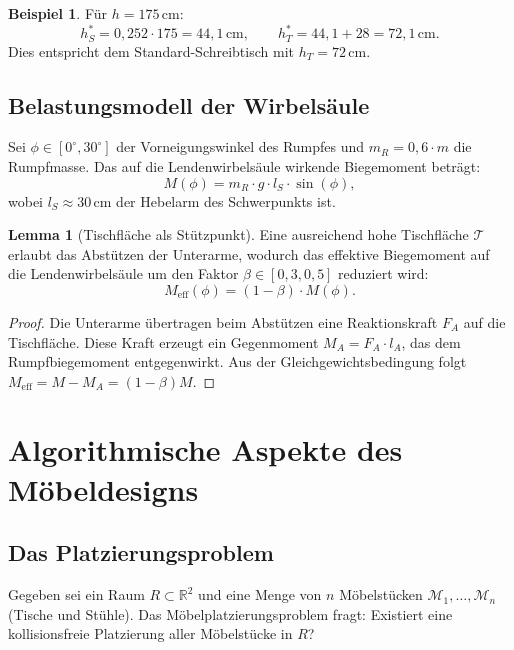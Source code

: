 ﻿\documentclass[a4paper,12pt]{article}
\theoremstyle{definition}
\newtheorem{beispiel}{Beispiel}
\newtheorem{lemma}{Lemma}
\begin{document}
\begin{beispiel}
	F\"{u}r $h = 175\,\mathrm{cm}$:
	\[
		h_S^* = 0{,}252 \cdot 175 = 44{,}1\,\mathrm{cm}, \qquad
		h_T^* = 44{,}1 + 28 = 72{,}1\,\mathrm{cm}.
	\]
	Dies entspricht dem Standard-Schreibtisch mit $h_T = 72\,\mathrm{cm}$.
\end{beispiel}

\subsection{Belastungsmodell der Wirbels\"{a}ule}

Sei $\phi \in [0^{\circ}, 30^{\circ}]$ der Vorneigungswinkel des Rumpfes und
$m_R = 0{,}6 \cdot m$ die Rumpfmasse. Das auf die Lendenwirbels\"{a}ule wirkende
Biegemoment betr\"{a}gt:
\[
	M(\phi) = m_R \cdot g \cdot l_S \cdot \sin(\phi),
\]
wobei $l_S \approx 30\,\mathrm{cm}$ der Hebelarm des Schwerpunkts ist.

\begin{lemma}[Tischfl\"{a}che als St\"{u}tzpunkt]
	Eine ausreichend hohe Tischfl\"{a}che $\mathcal{T}$ erlaubt das Abst\"{u}tzen der Unterarme,
	wodurch das effektive Biegemoment auf die Lendenwirbels\"{a}ule um den Faktor
	$\beta \in [0{,}3, 0{,}5]$ reduziert wird:
	\[
		M_{\mathrm{eff}}(\phi) = (1 - \beta) \cdot M(\phi).
	\]
\end{lemma}

\begin{proof}
	Die Unterarme \"{u}bertragen beim Abst\"{u}tzen eine Reaktionskraft $F_A$ auf die Tischfl\"{a}che.
	Diese Kraft erzeugt ein Gegenmoment $M_A = F_A \cdot l_A$, das dem Rumpfbiegemoment
	entgegenwirkt. Aus der Gleichgewichtsbedingung folgt
	$M_{\mathrm{eff}} = M - M_A = (1 - \beta) M$.
\end{proof}

\section{Algorithmische Aspekte des M\"{o}beldesigns}

\subsection{Das Platzierungsproblem}

Gegeben sei ein Raum $R \subset \mathbb{R}^2$ und eine Menge von $n$ M\"{o}belst\"{u}cken
$\mathcal{M}_1, \ldots, \mathcal{M}_n$ (Tische und St\"{u}hle). Das M\"{o}belplatzierungsproblem
fragt: Existiert eine kollisionsfreie Platzierung aller M\"{o}belst\"{u}cke in $R$?
\end{document}
